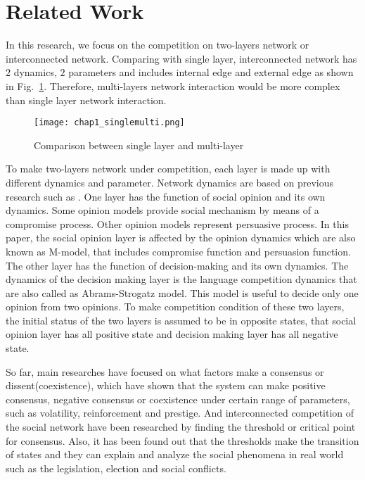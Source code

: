 \section{Related Work}
In this research, we focus on the competition on two-layers network or interconnected network. Comparing with single layer, interconnected network has $2$ dynamics, $2$ parameters and includes internal edge and external edge as shown in Fig.~\ref{chap1_singlemulti}. Therefore, multi-layers network interaction would be more complex than single layer network interaction.
\begin{figure}[!htb]
	\centering
	\texttt{[image: chap1\_singlemulti.png]}
	\caption{Comparison between single layer and multi-layer}
	\label{chap1_singlemulti}
\end{figure}

To make two-layers network under competition, each layer is made up with different dynamics and parameter. Network dynamics are based on previous research such as \parencite{alvarez2016}. One layer has the function of social opinion and its own dynamics. Some opinion models provide social mechanism by means of a compromise process.\parencite{naim2003} Other opinion models represent persuasive process.\parencite{chau2014} In this paper, the social opinion layer is affected by the opinion dynamics which are also known as M-model\parencite{rocca2014}, that includes compromise function and persuasion function. The other layer has the function of decision-making and its own dynamics. The dynamics of the decision making layer is the language competition dynamics that are also called as Abrams-Strogatz model\parencite{abrams2003, vazquez2010, patriarca2012}. This model is useful to decide only one opinion from two opinions. To make competition condition of these two layers, the initial status of the two layers is assumed to be in opposite states, that social opinion layer has all positive state and decision making layer has all negative state.

So far, main researches have focused on what factors make a consensus or dissent(coexistence), which have shown that the system can make positive consensus, negative consensus or coexistence under certain range of parameters, such as volatility, reinforcement and prestige.\parencite{alvarez2016} And interconnected competition of the social network have been researched by finding the threshold or critical point for consensus.\parencite{alvarez2016, gomez2015, diep2017} Also, it has been found out that the thresholds make the transition of states and they can explain and analyze the social phenomena in real world such as the legislation, election and social conflicts.\parencite{alvarez2016, amato2017, diep2017}

